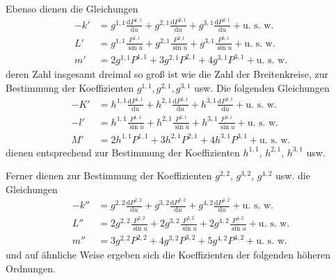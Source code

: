 Ebenso dienen die Gleichungen
\[
\begin{aligned}
-k'&=g^{1,1}\frac{\mathrm{d}P^{1,1}}{\mathrm{d}u}+g^{2,1}\frac{\mathrm{d}P^{2,1}}{\mathrm{d}u}+g^{3,1}\frac{\mathrm{d}P^{3,1}}{\mathrm{d}u}+\text{u. s. w.}\\
L'&=g^{1,1}\frac{P^{1,1}}{\sin u}+g^{2,1}\frac{P^{2,1}}{\sin u}+g^{3,1}\frac{P^{3,1}}{\sin u}+\text{u. s. w.}\\
m'&=2g^{1,1}P^{1,1}+3g^{2,1}P^{2,1}+4g^{3,1}P^{3,1}+\text{u. s. w.}
\end{aligned}
\]
deren Zahl insgesamt dreimal so groß ist wie die Zahl der Breitenkreise, zur Bestimmung der Koeffizienten $g^{1,1},g^{2,1},g^{3,1}$ usw. Die folgenden Gleichungen
\[
\begin{aligned}
-K'&=h^{1,1}\frac{\mathrm{d}P^{1,1}}{\mathrm{d}u}+h^{2,1}\frac{\mathrm{d}P^{2,1}}{\mathrm{d}u}+h^{3,1}\frac{\mathrm{d}P^{3,1}}{\mathrm{d}u}+\text{u. s. w.}\\
-l'&=h^{1,1}\frac{P^{1,1}}{\sin u}+h^{2,1}\frac{P^{2,1}}{\sin u}+h^{3,1}\frac{P^{3,1}}{\sin u}+\text{u. s. w.}\\
M'&=2h^{1,1}P^{1,1}+3h^{2,1}P^{2,1}+4h^{3,1}P^{3,1}+\text{u. s. w.}
\end{aligned}
\]
dienen entsprechend zur Bestimmung der Koeffizienten $h^{1,1}$, $h^{2,1}$, $h^{3,1}$ usw.

Ferner dienen zur Bestimmung der Koeffizienten $g^{2,2}$, $g^{3,2}$, $g^{4,2}$ usw. die Gleichungen
\[
\begin{aligned}
-k''&=g^{2,2}\frac{\mathrm{d}P^{2,2}}{\mathrm{d}u}+g^{3,2}\frac{\mathrm{d}P^{3,2}}{\mathrm{d}u}+g^{4,2}\frac{\mathrm{d}P^{4,2}}{\mathrm{d}u}+\text{u. s. w.}\\
L''&=2g^{2,2}\frac{P^{2,2}}{\sin u}+2g^{3,2}\frac{P^{3,2}}{\sin u}+2g^{4,2}\frac{P^{4,2}}{\sin u}+\text{u. s. w.}\\
m''&=3g^{2,2}P^{2,2}+4g^{3,2}P^{3,2}+5g^{4,2}P^{4,2}+\text{u. s. w.}
\end{aligned}
\]
und auf ähnliche Weise ergeben sich die Koeffizienten der folgenden höheren Ordnungen.

